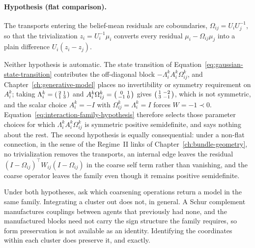 \paragraph{Hypothesis (flat comparison).}
The transports entering the belief-mean residuals are coboundaries, \(\Omega_{ij}=U_iU_j^{-1}\), so that the trivialization \(z_i=U_i^{-1}\mu_i\) converts every residual \(\mu_i-\Omega_{ij}\mu_j\) into a plain difference \(U_i(z_i-z_j)\).

Neither hypothesis is automatic. The state transition of Equation~\eqref{eq:gaussian-state-transition} contributes the off-diagonal block \(-\Lambda_i^{k}A_i^{k}\Omega_{ij}^{k}\), and Chapter~\ref{ch:generative-model} places no invertibility or symmetry requirement on \(A_i^{k}\); taking \(\Lambda_i^{k}=\begin{psmallmatrix}2&1\\1&3\end{psmallmatrix}\) and \(A_i^{k}\Omega_{ij}^{k}=\begin{psmallmatrix}0&1\\-1&0\end{psmallmatrix}\) gives \(\begin{psmallmatrix}1&-2\\3&-1\end{psmallmatrix}\), which is not symmetric, and the scalar choice \(A_i^{k}=-I\) with \(\Omega_{ij}^{k}=\Lambda_i^{k}=I\) forces \(W=-1\prec 0\). Equation~\eqref{eq:interaction-family-hypothesis} therefore selects those parameter choices for which \(\Lambda_i^{k}A_i^{k}\Omega_{ij}^{k}\) is symmetric positive semidefinite, and says nothing about the rest. The second hypothesis is equally consequential: under a non-flat connection, in the sense of the Regime~II links of Chapter~\ref{ch:bundle-geometry}, no trivialization removes the transports, an internal edge leaves the residual \((I-\Omega_{ij})^{\top}W_{ij}(I-\Omega_{ij})\) in the coarse self term rather than vanishing, and the coarse operator leaves the family even though it remains positive semidefinite.

Under both hypotheses, ask which coarsening operations return a model in the same family. Integrating a cluster out does not, in general. A Schur complement manufactures couplings between agents that previously had none, and the manufactured blocks need not carry the sign structure the family requires, so form preservation is not available as an identity. Identifying the coordinates within each cluster does preserve it, and exactly.

